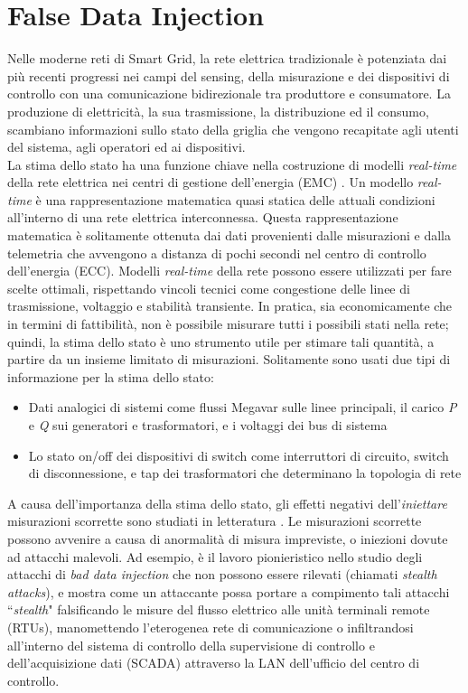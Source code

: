 \section{False Data Injection}
Nelle moderne reti di Smart Grid, la rete elettrica tradizionale è potenziata dai più recenti progressi nei campi del sensing, della misurazione e dei dispositivi di controllo con una comunicazione bidirezionale tra produttore e consumatore. La produzione di elettricità, la sua trasmissione, la distribuzione ed il consumo, scambiano informazioni sullo stato della griglia che vengono recapitate agli utenti del sistema, agli operatori ed ai dispositivi.\\
La stima dello stato ha una funzione chiave nella costruzione di modelli \emph{real-time} della rete elettrica nei centri di gestione dell'energia (EMC) \cite{monticelli}. Un modello \emph{real-time} è una rappresentazione matematica quasi statica delle attuali condizioni all'interno di una rete elettrica interconnessa. Questa rappresentazione matematica è solitamente ottenuta dai dati provenienti dalle misurazioni e dalla telemetria che avvengono a distanza di pochi secondi nel centro di controllo dell'energia (ECC). Modelli \emph{real-time} della rete possono essere utilizzati per fare scelte ottimali, rispettando vincoli tecnici come congestione delle linee di trasmissione, voltaggio e stabilità transiente. In pratica, sia economicamente che in termini di fattibilità, non è possibile misurare tutti i possibili stati nella rete; quindi, la stima dello stato è uno strumento utile per stimare tali quantità, a partire da un insieme limitato di misurazioni. Solitamente sono usati due tipi di informazione per la stima dello stato:
\begin{itemize}
	\item Dati analogici di sistemi come flussi Megavar sulle linee principali, il carico \emph{P} e \emph{Q} sui generatori e trasformatori, e i voltaggi dei bus di sistema
	\item Lo stato on/off dei dispositivi di switch come interruttori di circuito, switch di disconnessione, e tap dei trasformatori che determinano la topologia di rete
\end{itemize}
A causa dell'importanza della stima dello stato, gli effetti negativi dell'\emph{iniettare} misurazioni scorrette sono studiati in letteratura \cite{baddatainj}.  Le misurazioni scorrette possono avvenire a causa di anormalità di misura impreviste, o iniezioni dovute ad attacchi malevoli. Ad esempio, \cite{falsedatainj} è il lavoro pionieristico nello studio degli attacchi di \emph{bad data injection} che non possono essere rilevati (chiamati \emph{stealth attacks}), e mostra come un attaccante possa portare a compimento tali attacchi ``\emph{stealth}" falsificando le misure del flusso elettrico alle unità terminali remote (RTUs), manomettendo l'eterogenea rete di comunicazione o infiltrandosi all'interno del sistema di controllo della supervisione di controllo e dell'acquisizione dati (SCADA) attraverso la LAN dell'ufficio del centro di controllo.

